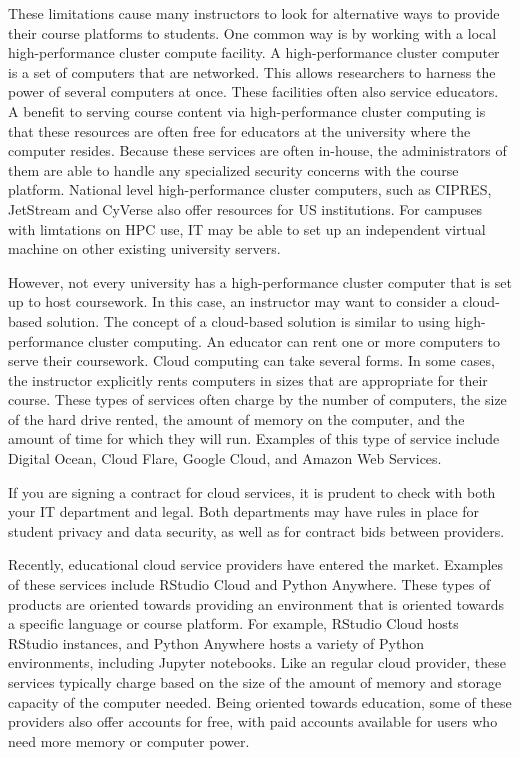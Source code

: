 These limitations cause many instructors to look for alternative ways to provide their course platforms to students.
One common way is by working with a local high-performance cluster compute facility.
A high-performance cluster computer is a set of computers that are networked. 
This allows researchers to harness the power of several computers at once.
These facilities often also service educators.
A benefit to serving course content via high-performance cluster computing is that these resources are often free for educators at the university where the computer resides.
Because these services are often in-house, the administrators of them are able to handle any specialized security concerns with the course platform.
National level high-performance cluster computers, such as CIPRES, JetStream and CyVerse also offer resources for US institutions.
For campuses with limtations on HPC use, IT may be able to set up an independent virtual machine
on other existing university servers.

However, not every university has a high-performance cluster computer that is set up to host coursework. 
In this case, an instructor may want to consider a cloud-based solution. 
The concept of a cloud-based solution is similar to using high-performance cluster computing.
An educator can rent one or more computers to serve their coursework. 
Cloud computing can take several forms. 
In some cases, the instructor explicitly rents computers in sizes that are appropriate for their course.
These types of services often charge by the number of computers, the size of the hard drive rented, the amount of memory on the computer, and the amount of time for which they will run.
Examples of this type of service include Digital Ocean, Cloud Flare, Google Cloud, and Amazon Web Services.

{\begin{framed}
If you are signing a contract for cloud services, it is prudent to check with both your IT department and legal. 
Both departments may have rules in place for student privacy and data security, as well as for contract bids between providers.
\end{framed}}

Recently, educational cloud service providers have entered the market.
Examples of these services include RStudio Cloud and Python Anywhere. 
These types of products are oriented towards providing an environment that is oriented towards a specific language or course platform. 
For example, RStudio Cloud hosts RStudio instances, and Python Anywhere hosts a variety of Python environments, including Jupyter notebooks. 
Like an regular cloud provider, these services typically charge based on the size of the amount of memory and storage capacity of the computer needed.
Being oriented towards education, some of these providers also offer accounts for free, with paid accounts available for users who need more memory or computer power.

